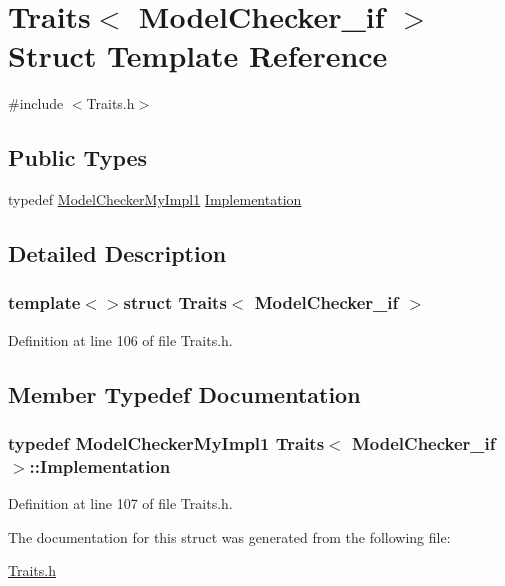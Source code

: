 \hypertarget{struct_traits_3_01_model_checker__if_01_4}{\section{Traits$<$ Model\-Checker\-\_\-if $>$ Struct Template Reference}
\label{struct_traits_3_01_model_checker__if_01_4}
}


{\ttfamily \#include $<$Traits.\-h$>$}

\subsection*{Public Types}
\begin{DoxyCompactItemize}
\item 
typedef \hyperlink{class_model_checker_my_impl1}{Model\-Checker\-My\-Impl1} \hyperlink{struct_traits_3_01_model_checker__if_01_4_aa969b0d5a3092d9a06c83185140de59b}{Implementation}
\end{DoxyCompactItemize}


\subsection{Detailed Description}
\subsubsection*{template$<$$>$struct Traits$<$ Model\-Checker\-\_\-if $>$}



Definition at line 106 of file Traits.\-h.



\subsection{Member Typedef Documentation}
\hypertarget{struct_traits_3_01_model_checker__if_01_4_aa969b0d5a3092d9a06c83185140de59b}{
\subsubsection[{Implementation}]{\setlength{\rightskip}{0pt plus 5cm}typedef {\bf Model\-Checker\-My\-Impl1} {\bf Traits}$<$ {\bf Model\-Checker\-\_\-if} $>$\-::{\bf Implementation}}}\label{struct_traits_3_01_model_checker__if_01_4_aa969b0d5a3092d9a06c83185140de59b}


Definition at line 107 of file Traits.\-h.



The documentation for this struct was generated from the following file\-:\begin{DoxyCompactItemize}
\item 
\hyperlink{_traits_8h}{Traits.\-h}\end{DoxyCompactItemize}
